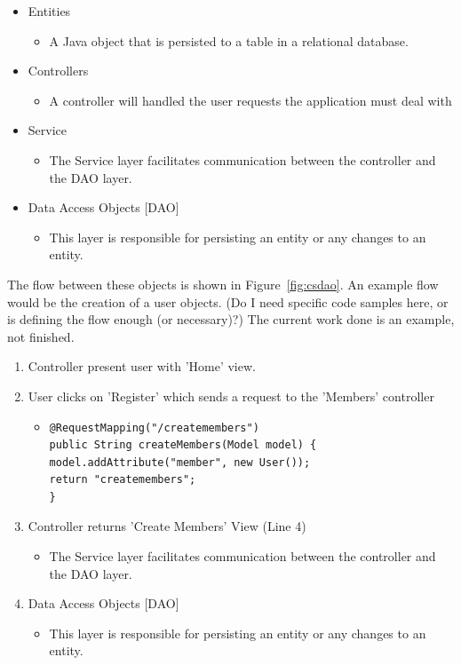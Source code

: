 \begin{table}[H]
\begin{itemize}
\item Entities
\begin{itemize}
\item A Java object that is persisted to a table in a relational database.
\end{itemize}
\item Controllers
\begin{itemize}
\item A controller will handled the user requests the application must deal with
\end{itemize}
\item Service
\begin{itemize}
\item The Service layer facilitates communication between the controller and the DAO layer.
\end{itemize}
\item Data Access Objects [DAO]
\begin{itemize}
\item This layer is responsible for persisting an entity or any changes to an entity.
\end{itemize}
\end{itemize}
\label{fig:appbreakdown}
\end{table}

The flow between these objects is shown in Figure~\ref{fig:csdao}. An example flow would be the creation of a user objects. (Do I need specific code samples here, or is defining the flow enough (or necessary)?) The current work done is an example, not finished.
\begin{table}[H]
\begin{enumerate}
\item Controller present user with 'Home' view.
\item User clicks on 'Register' which sends a request to the 'Members' controller
\begin{itemize}
\item
\begin{lstlisting}
@RequestMapping("/createmembers")
public String createMembers(Model model) {
model.addAttribute("member", new User());
return "createmembers";
}
\end{lstlisting}
\end{itemize}
\item Controller returns 'Create Members' View (Line 4)
\begin{itemize}
\item The Service layer facilitates communication between the controller and the DAO layer.
\end{itemize}
\item Data Access Objects [DAO]
\begin{itemize}
\item This layer is responsible for persisting an entity or any changes to an entity.
\end{itemize}
\end{enumerate}
\label{fig:layerExplain}
\end{table}


